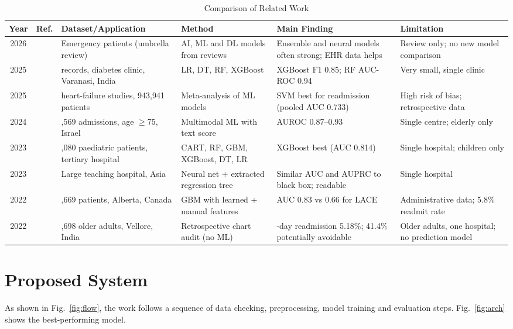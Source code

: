 \documentclass[conference,a4paper]{IEEEtran}
\begin{document}
\begin{table}[!t]
\caption{Comparison of Related Work}
\label{tab:lit}
\centering\footnotesize\renewcommand{\arraystretch}{1.1}\setlength{\tabcolsep}{3pt}
\begin{tabular}{|c|c|>{\raggedright\arraybackslash}p{1.5in}|>{\raggedright\arraybackslash}p{1.35in}|>{\raggedright\arraybackslash}p{1.6in}|>{\raggedright\arraybackslash}p{1.4in}|}
\hline
\textbf{Year} & \textbf{Ref.} & \textbf{Dataset/Application} & \textbf{Method} & \textbf{Main Finding} & \textbf{Limitation} \\\hline
2026 & \cite{alrazeeni} & Emergency patients (umbrella review) & AI, ML and DL models from reviews & Ensemble and neural models often strong; EHR data helps & Review only; no new model comparison \\
2025 & \cite{mishra} & 352 records, diabetes clinic, Varanasi, India & LR, DT, RF, XGBoost & XGBoost F1 0.85; RF AUC-ROC 0.94 & Very small, single clinic \\
2025 & \cite{hajishah} & 64 heart-failure studies, 943,941 patients & Meta-analysis of ML models & SVM best for readmission (pooled AUC 0.733) & High risk of bias; retrospective data \\
2024 & \cite{loutati} & 19,569 admissions, age $\geq$75, Israel & Multimodal ML with text score & AUROC 0.87--0.93 & Single centre; elderly only \\
2023 & \cite{silva} & 9,080 paediatric patients, tertiary hospital & CART, RF, GBM, XGBoost, DT, LR & XGBoost best (AUC 0.814) & Single hospital; children only \\
2023 & \cite{gao} & Large teaching hospital, Asia & Neural net + extracted regression tree & Similar AUC and AUPRC to black box; readable & Single hospital \\
2022 & \cite{davis} & 428,669 patients, Alberta, Canada & GBM with learned + manual features & AUC 0.83 vs 0.66 for LACE & Administrative data; 5.8\% readmit rate \\
2022 & \cite{samuel} & 2,698 older adults, Vellore, India & Retrospective chart audit (no ML) & 30-day readmission 5.18\%; 41.4\% potentially avoidable & Older adults, one hospital; no prediction model \\
\hline
\end{tabular}
\end{table}

\section{Proposed System}
As shown in Fig.~\ref{fig:flow}, the work follows a sequence of data checking, preprocessing, model training and evaluation steps. Fig.~\ref{fig:arch} shows the best-performing model.
\end{document}
